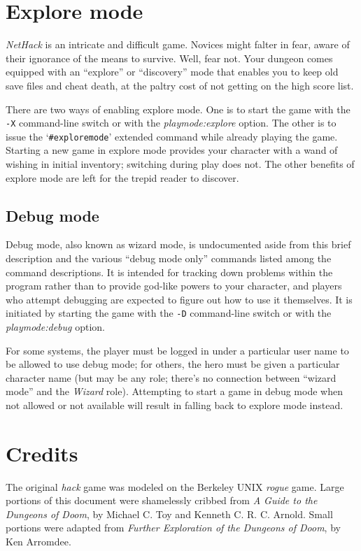 \documentclass[titlepage]{article}
\begin{document}
\section{Explore mode}

\textit{NetHack} is an intricate and difficult game.  Novices might falter
in fear, aware of their ignorance of the means to survive.  Well, fear
not.  Your dungeon comes equipped with an ``explore'' or ``discovery''
mode that enables you to keep old save files and cheat death, at the
paltry cost of not getting on the high score list.

There are two ways of enabling explore mode.  One is to start the game
with the \texttt{-X}
command-line switch or with the
\textit{playmode:explore}
option.  The other is to issue the `\texttt{\#exploremode}' extended command while
already playing the game.  Starting a new game in explore mode provides your
character with a wand of wishing in initial inventory; switching
during play does not.  The other benefits of explore mode are left for
the trepid reader to discover.

\subsection*{Debug mode}

Debug mode, also known as wizard mode, is undocumented aside from this
brief description and the various ``debug mode only'' commands listed
among the command descriptions.
It is intended for tracking down problems within the
program rather than to provide god-like powers to your character, and
players who attempt debugging are expected to figure out how to use it
themselves.
It is initiated by starting the game with the
\texttt{-D}
command-line switch or with the
\textit{playmode:debug}
option.

For some systems, the player must be logged in
under a particular user name to be allowed to use debug mode; for others,
the hero must be given a particular character name (but may be any role;
there's no connection between ``wizard mode'' and the \textit{Wizard} role).
Attempting to start a game in debug mode when not allowed
or not available will result in falling back to explore mode instead.

\section{Credits}
The original %
\textit{hack} game was modeled on the Berkeley
UNIX
\textit{rogue} game.  Large portions of this document were shamelessly
cribbed from %
\textit{A Guide to the Dungeons of Doom}, by Michael C. Toy
and Kenneth C. R. C. Arnold.  Small portions were adapted from
\textit{Further Exploration of the Dungeons of Doom}, by Ken Arromdee.
\end{document}
